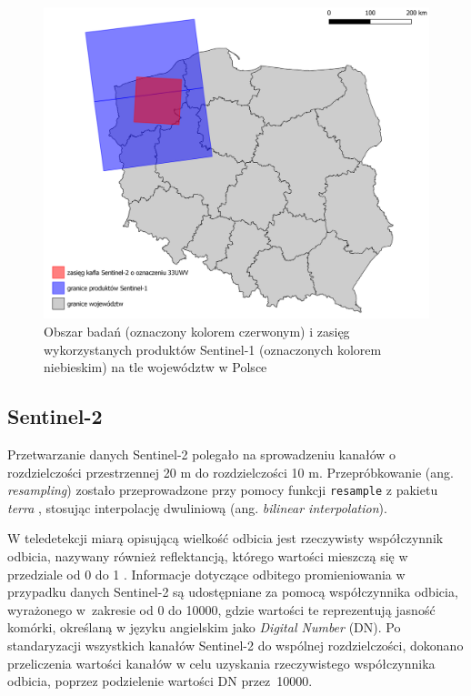\documentclass{amuthesis}
\begin{document}
\begin{figure}[t]

{\centering \includegraphics[width=1\textwidth,height=\textheight]{figures/sen1_extents.png}

}

\caption{\label{fig-rycina-s1-extents}Obszar badań (oznaczony kolorem
czerwonym) i zasięg wykorzystanych produktów Sentinel-1 (oznaczonych
kolorem niebieskim) na tle województw w Polsce}

\end{figure}

\hypertarget{sec-processing-s2}{%
\subsection{Sentinel-2}\label{sec-processing-s2}}

Przetwarzanie danych Sentinel-2 polegało na sprowadzeniu kanałów o
rozdzielczości przestrzennej 20 m do rozdzielczości 10 m.
Przepróbkowanie (ang. \emph{resampling}) zostało przeprowadzone przy
pomocy funkcji \texttt{resample} z pakietu \emph{terra}
\autocite{R-terra}, stosując interpolację dwuliniową (ang.
\emph{bilinear interpolation}).

W teledetekcji miarą opisującą wielkość odbicia jest rzeczywisty
współczynnik odbicia, nazywany również reflektancją, którego wartości
mieszczą się w przedziale od 0 do 1 \autocite{hejmanowska_2020_dane}.
Informacje dotyczące odbitego promieniowania w przypadku danych
Sentinel-2 są udostępniane za pomocą współczynnika odbicia, wyrażonego
w~zakresie od 0 do 10000, gdzie wartości te reprezentują jasność
komórki, określaną w języku angielskim jako \emph{Digital Number} (DN).
Po standaryzacji wszystkich kanałów Sentinel-2 do wspólnej
rozdzielczości, dokonano przeliczenia wartości kanałów w celu uzyskania
rzeczywistego współczynnika odbicia, poprzez podzielenie wartości DN
przez~10000.
\end{document}
